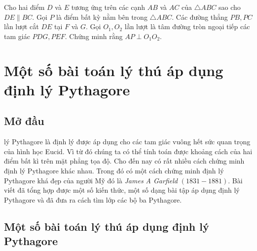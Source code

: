 \begin{bt}%
Cho hai điểm $D$ và $E$ tương ứng trên các cạnh $AB$ và $AC$ của $\triangle ABC$ sao cho $DE \parallel BC$. Gọi $P$ là điểm bất kỳ nằm bên trong $\triangle ABC$. Các đường thẳng $PB,PC$ lần lượt cắt $DE$ tại $F$ và $G$. Gọi $O_1,O_2$ lần lượt là tâm đường tròn ngoại tiếp các tam giác $PDG,PEF$. Chứng minh rằng $AP \perp O_1O_2$.
\end{bt}


\setcounter{bt}{0}
\section{Một số bài toán lý thú áp dụng định lý Pythagore}
\begin{center}
\textbf{\color{violet}{Nguyễn Văn Hiệu\\
(GV THCS Vĩnh Hưng, Phú Lộc, Thừa Thiên Huế)}}
\end{center}
\subsection{Mở đầu}
 lý Pythagore là định lý được áp dụng cho các tam giác vuông hết sức quan trọng của hình học Eucid. Vì từ đó chúng ta có thể tính toán được khoảng cách của hai điểm bất kì trên mặt phẳng tọa độ. Cho đến nay có rất nhiều cách chứng minh định lý Pythagore khác nhau. Trong đó có một cách chứng minh định lý Pythagore khá đẹp của người Mỹ đó là {\it James A Garfield} $(1831-1881).$ Bài viết đã tổng hợp được một số kiến thức, một số dạng bài tập áp dụng định lý Pythagore và đã đưa ra cách tìm lớp các bộ ba Pythagore.
\subsection{Một số bài toán lý thú áp dụng định lý Pythagore}

